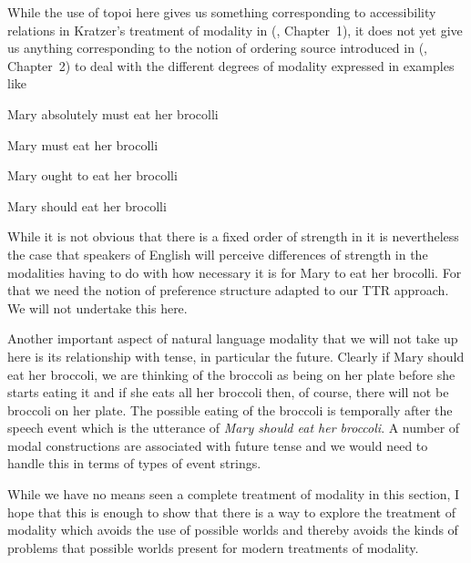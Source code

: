 While the use of topoi here gives us something corresponding to
accessibility relations in Kratzer's treatment of modality in
\cite{Kratzer1977} (\citealp{Kratzer2012}, Chapter~1), it does not yet
give us anything corresponding to the notion of ordering source
introduced in \cite{Kratzer1981} (\citealp{Kratzer2012}, Chapter~2) to
deal with the different degrees of modality expressed in examples like
\begin{ex} 
\begin{subex} 
 
\item Mary absolutely must eat her brocolli 
 
\item Mary must eat her brocolli

\item Mary ought to eat her brocolli

\item Mary should eat her brocolli
 
 
\end{subex} 
   
\end{ex} 
While it is not obvious that there is a fixed order of strength in
\preveg{} it is nevertheless the case that speakers of English will
perceive differences of strength in the modalities having to do with
how necessary it is for Mary to eat her brocolli.  For that we need
the notion of preference structure \citep{CondoravdiLauer2016} adapted
to our TTR approach.   We will not undertake this here.

Another important aspect of natural language modality that we will not
take up here is its relationship with tense, in particular the
future.  Clearly if Mary should eat her broccoli, we are thinking of
the broccoli as being on her plate before she starts eating it and if
she eats all her broccoli then, of course, there will not be broccoli
on her plate.  The possible eating of the broccoli is temporally after
the speech event which is the utterance of \textit{Mary should eat her
  broccoli}.  A number of modal constructions are associated with
future tense and we would need to handle this in terms of types of
event strings.

While we have no means seen a complete treatment of modality in this
section, I hope that this is enough to show that there is a way to
explore the treatment of modality which avoids the use of possible
worlds and thereby avoids the kinds of problems
that possible worlds present for modern treatments of modality.


